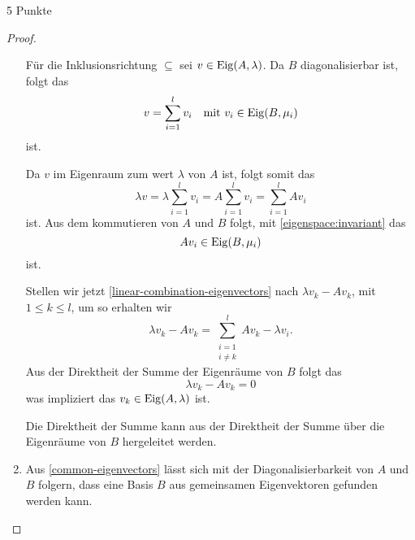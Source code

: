 \documentclass{problemset}
\begin{document}
\begin{problem}{5 Punkte}
\begin{proof}
\begin{enumerate}
              Für die Inklusionsrichtung \(\subseteq\) sei \(v \in \operatorname{Eig}(A,
              \lambda)\). Da \(B\) diagonalisierbar ist, folgt das
              \begin{equation*}
                  v = \sum_{i = 1}^l v_i \quad \text{mit } v_i \in \operatorname{Eig}(B, \mu_i)
              \end{equation*} ist.

              Da \(v\) im Eigenraum zum wert \(\lambda\) von \(A\) ist, folgt
              somit das
              \begin{equation}
                  \lambda v = \lambda \sum_{i = 1}^l v_i = A \sum_{i = 1}^l v_i = \sum_{i = 1}^l A v_i \label{linear-combination-eigenvectors}
              \end{equation} ist.
              Aus dem kommutieren von \(A\) und \(B\) folgt, mit \autoref{eigenspace:invariant} das
              \begin{equation*}
                  A v_i \in \operatorname{Eig}(B, \mu_i)
              \end{equation*} ist.

              Stellen wir jetzt \autoref{linear-combination-eigenvectors} nach
              \(\lambda v_k - Av_k\), mit \(1 \le k \le l\), um so erhalten wir
              \begin{equation*}
                  \lambda v_k - Av_k = \sum_{\substack{i = 1 \\ i \neq k}}^{l} A v_k - \lambda v_i.
              \end{equation*}
              Aus der Direktheit der Summe der Eigenräume von \(B\) folgt das
              \begin{equation*}
                  \lambda v_k - Av_k = 0
              \end{equation*}
              was impliziert das \(v_k \in \operatorname{Eig}(A, \lambda)\) ist.

              Die Direktheit der Summe kann aus der Direktheit der Summe über
              die Eigenräume von \(B\) hergeleitet werden.

        \item Aus \autoref{common-eigenvectors} lässt sich mit der
              Diagonalisierbarkeit von \(A\) und \(B\) folgern, dass eine Basis
              \(B\) aus gemeinsamen Eigenvektoren gefunden werden kann.


\end{enumerate}
\end{proof}
\end{problem}
\end{document}
